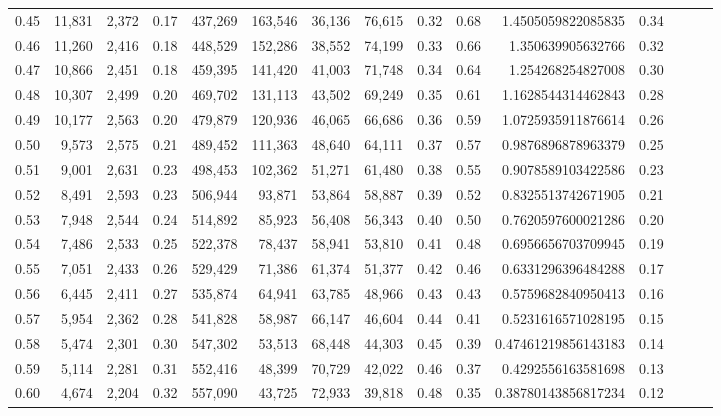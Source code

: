 \begin{tabular}{rrrrrrrrrrrrrrr}
0.45 &  11,831 &  2,372 &  0.17 &  437,269 &  163,546 &   36,136 &   76,615 &  0.32 &  0.68 &     1.4505059822085835 &      0.34 \\
0.46 &  11,260 &  2,416 &  0.18 &  448,529 &  152,286 &   38,552 &   74,199 &  0.33 &  0.66 &      1.350639905632766 &      0.32 \\
0.47 &  10,866 &  2,451 &  0.18 &  459,395 &  141,420 &   41,003 &   71,748 &  0.34 &  0.64 &      1.254268254827008 &      0.30 \\
0.48 &  10,307 &  2,499 &  0.20 &  469,702 &  131,113 &   43,502 &   69,249 &  0.35 &  0.61 &     1.1628544314462843 &      0.28 \\
0.49 &  10,177 &  2,563 &  0.20 &  479,879 &  120,936 &   46,065 &   66,686 &  0.36 &  0.59 &     1.0725935911876614 &      0.26 \\
0.50 &   9,573 &  2,575 &  0.21 &  489,452 &  111,363 &   48,640 &   64,111 &  0.37 &  0.57 &     0.9876896878963379 &      0.25 \\
0.51 &   9,001 &  2,631 &  0.23 &  498,453 &  102,362 &   51,271 &   61,480 &  0.38 &  0.55 &     0.9078589103422586 &      0.23 \\
0.52 &   8,491 &  2,593 &  0.23 &  506,944 &   93,871 &   53,864 &   58,887 &  0.39 &  0.52 &     0.8325513742671905 &      0.21 \\
0.53 &   7,948 &  2,544 &  0.24 &  514,892 &   85,923 &   56,408 &   56,343 &  0.40 &  0.50 &     0.7620597600021286 &      0.20 \\
0.54 &   7,486 &  2,533 &  0.25 &  522,378 &   78,437 &   58,941 &   53,810 &  0.41 &  0.48 &     0.6956656703709945 &      0.19 \\
0.55 &   7,051 &  2,433 &  0.26 &  529,429 &   71,386 &   61,374 &   51,377 &  0.42 &  0.46 &     0.6331296396484288 &      0.17 \\
0.56 &   6,445 &  2,411 &  0.27 &  535,874 &   64,941 &   63,785 &   48,966 &  0.43 &  0.43 &     0.5759682840950413 &      0.16 \\
0.57 &   5,954 &  2,362 &  0.28 &  541,828 &   58,987 &   66,147 &   46,604 &  0.44 &  0.41 &     0.5231616571028195 &      0.15 \\
0.58 &   5,474 &  2,301 &  0.30 &  547,302 &   53,513 &   68,448 &   44,303 &  0.45 &  0.39 &    0.47461219856143183 &      0.14 \\
0.59 &   5,114 &  2,281 &  0.31 &  552,416 &   48,399 &   70,729 &   42,022 &  0.46 &  0.37 &     0.4292556163581698 &      0.13 \\
0.60 &   4,674 &  2,204 &  0.32 &  557,090 &   43,725 &   72,933 &   39,818 &  0.48 &  0.35 &    0.38780143856817234 &      0.12 \\

\end{tabular}
